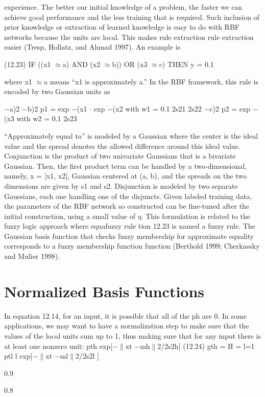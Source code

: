experience. The better our initial knowledge of a problem, the faster we can achieve good performance and the less training that is required. Such inclusion of prior knowledge or extraction of learned knowledge is easy to do with RBF networks because the units are local. This makes rule extraction rule extraction easier (Tresp, Hollatz, and Ahmad 1997). An example is

(12.23) IF ((x1 $\approx$a) AND (x2 $\approx$b)) OR (x3 $\approx$c) THEN y = 0.1

where x1 $\approx$a means “x1 is approximately a.” In the RBF framework, this rule is encoded by two Gaussian units as

$-$a)2 $-$b)2 p1 = exp $-$(x1 $\cdot$ exp $-$(x2 with w1 = 0.1 2s21 2s22 $-$c)2 p2 = exp $-$(x3 with w2 = 0.1 2s23

“Approximately equal to” is modeled by a Gaussian where the center is the ideal value and the spread denotes the allowed difference around this ideal value. Conjunction is the product of two univariate Gaussians that is a bivariate Gaussian. Then, the first product term can be handled by a two-dimensional, namely, x = [x1, x2], Gaussian centered at (a, b), and the spreads on the two dimensions are given by s1 and s2. Disjunction is modeled by two separate Gaussians, each one handling one of the disjuncts. Given labeled training data, the parameters of the RBF network so constructed can be fine-tuned after the initial construction, using a small value of $\eta$. This formulation is related to the fuzzy logic approach where equafuzzy rule tion 12.23 is named a fuzzy rule. The Gaussian basis function that checks fuzzy membership for approximate equality corresponds to a fuzzy membership function function (Berthold 1999; Cherkassky and Mulier 1998).

\section{Normalized Basis Functions}

In equation 12.14, for an input, it is possible that all of the ph are 0. In some applications, we may want to have a normalization step to make sure that the values of the local units sum up to 1, thus making sure that for any input there is at least one nonzero unit: pth exp[$-$$\parallel$xt $-$mh$\parallel$2/2s2h] (12.24) gth = H = l=1 ptl l exp[$-$$\parallel$xt $-$ml$\parallel$2/2s2l ]

0.9

0.8

